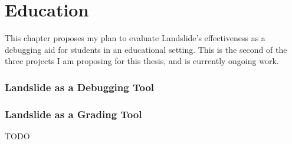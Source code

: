 \chapter{Education}
\label{chap:410}

This chapter proposes my plan to evaluate Landslide's effectiveness as a debugging aid for students in an educational setting.
This is the second of the three projects I am proposing for this thesis, and is currently ongoing work.

\subsection{Landslide as a Debugging Tool}
\label{sec:studence}

\subsection{Landslide as a Grading Tool}
\label{sec:grading}

TODO
